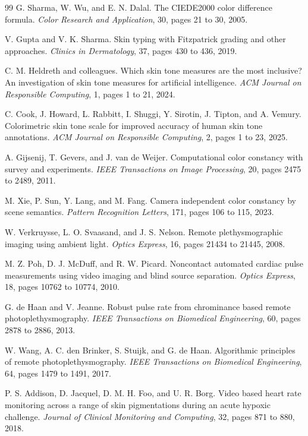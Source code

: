 \documentclass[12pt]{article}
\begin{document}
\begin{thebibliography}{99}
G. Sharma, W. Wu, and E. N. Dalal.
The CIEDE2000 color difference formula.
\textit{Color Research and Application}, 30, pages 21 to 30, 2005.

V. Gupta and V. K. Sharma.
Skin typing with Fitzpatrick grading and other approaches.
\textit{Clinics in Dermatology}, 37, pages 430 to 436, 2019.

C. M. Heldreth and colleagues.
Which skin tone measures are the most inclusive? An investigation of skin tone measures for artificial intelligence.
\textit{ACM Journal on Responsible Computing}, 1, pages 1 to 21, 2024.

C. Cook, J. Howard, L. Rabbitt, I. Shuggi, Y. Sirotin, J. Tipton, and A. Vemury.
Colorimetric skin tone scale for improved accuracy of human skin tone annotations.
\textit{ACM Journal on Responsible Computing}, 2, pages 1 to 23, 2025.

A. Gijsenij, T. Gevers, and J. van de Weijer.
Computational color constancy with survey and experiments.
\textit{IEEE Transactions on Image Processing}, 20, pages 2475 to 2489, 2011.

M. Xie, P. Sun, Y. Lang, and M. Fang.
Camera independent color constancy by scene semantics.
\textit{Pattern Recognition Letters}, 171, pages 106 to 115, 2023.

W. Verkruysse, L. O. Svaasand, and J. S. Nelson.
Remote plethysmographic imaging using ambient light.
\textit{Optics Express}, 16, pages 21434 to 21445, 2008.

M. Z. Poh, D. J. McDuff, and R. W. Picard.
Noncontact automated cardiac pulse measurements using video imaging and blind source separation.
\textit{Optics Express}, 18, pages 10762 to 10774, 2010.

G. de Haan and V. Jeanne.
Robust pulse rate from chrominance based remote photoplethysmography.
\textit{IEEE Transactions on Biomedical Engineering}, 60, pages 2878 to 2886, 2013.

W. Wang, A. C. den Brinker, S. Stuijk, and G. de Haan.
Algorithmic principles of remote photoplethysmography.
\textit{IEEE Transactions on Biomedical Engineering}, 64, pages 1479 to 1491, 2017.

P. S. Addison, D. Jacquel, D. M. H. Foo, and U. R. Borg.
Video based heart rate monitoring across a range of skin pigmentations during an acute hypoxic challenge.
\textit{Journal of Clinical Monitoring and Computing}, 32, pages 871 to 880, 2018.


\end{thebibliography}
\end{document}

